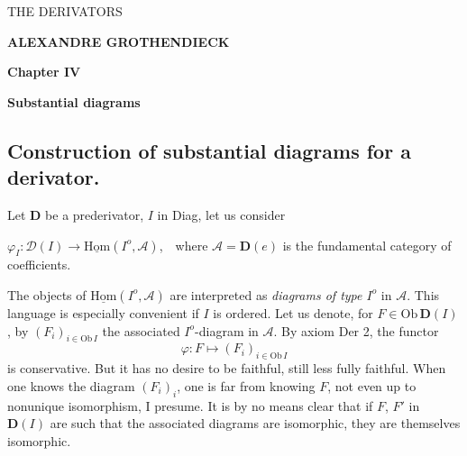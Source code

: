 \documentclass[11pt]{article}
\newcommand{\printedpage}[1]{\marginpar{\footnotesize p.~#1}}
\newcommand{\msp}[1]{\marginpar{\footnotesize [#1]}}
\newcommand{\D}{\mathbf{D}}
\newcommand{\cA}{\mathcal{A}}
\newcommand{\uHom}{\underline{\mathrm{Hom}}}
\begin{document}
\printedpage{}%

\begin{center}
{\LARGE\textsf{THE DERIVATORS}}

\bigskip

\textbf{ALEXANDRE GROTHENDIECK}

\bigskip\bigskip

\textbf{Chapter IV}

\medskip

\textbf{Substantial diagrams}
\end{center}

\clearpage


\printedpage{1}

\noindent

\msp{page 73}

\subsection*{Construction of substantial diagrams for a derivator.}

\noindent Let $\D$ be a prederivator, $I$ in Diag, let us consider

\noindent $\varphi_I : \mathcal{D}(I) \longrightarrow \uHom(I^o,\cA)$,\ \ where $\cA=\D(e)$ is the fundamental category of coefficients. %

The objects of $\uHom(I^o,\cA)$ are interpreted as \textit{diagrams of type $I^o$} in $\cA$. This language is especially convenient if $I$ is ordered. Let us denote, for $F\in\mathrm{Ob}\,\D(I)$, by $(F_i)_{i\in\mathrm{Ob}\,I}$ the associated $I^o$-diagram in $\cA$. By axiom Der 2, the functor
\[
\varphi : F \longmapsto (F_i)_{i\in\mathrm{Ob}\,I}
\]
is conservative. But it has no desire to be faithful, still less fully faithful. When one knows the diagram $(F_i)_i$, one is far from knowing $F$, not even up to nonunique isomorphism, I presume. It is by no means clear that if $F$, $F'$ in $\D(I)$ are such that the associated diagrams are isomorphic, they are themselves isomorphic.
\end{document}
